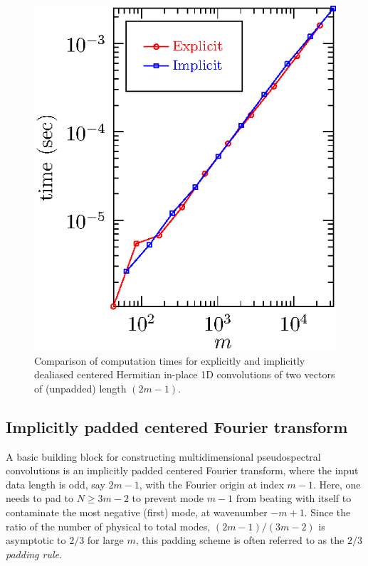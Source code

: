 \documentclass[final]{siamltex}
\begin{document}
\begin{figure}[htbp]
\begin{center}
\begin{minipage}{0.49\linewidth}
\begin{center}
\includegraphics{timing1r}
\caption{Comparison of computation times for explicitly and implicitly
dealiased centered Hermitian in-place 1D convolutions of two vectors of
(unpadded) length $(2m-1)$.}
\label{timing1r}
\end{center}
\end{minipage}
\end{center}
\end{figure}

\subsection{Implicitly padded centered Fourier transform}\label{fft0}
A basic building block for constructing multidimensional pseudospectral
convolutions is an implicitly padded centered Fourier transform, where the
input data length is odd, say $2m-1$, with the Fourier origin at index $m-1$. 
Here, one needs to pad to $N\ge 3m-2$ to prevent 
mode $m-1$ from beating with itself to contaminate the most negative
(first) mode, at wavenumber $-m+1$. Since the ratio of the number of physical to
total modes, $(2m-1)/(3m-2)$ is asymptotic to $2/3$ for large $m$, this
padding scheme is often referred to as the {\it $2/3$ padding rule}.
\end{document}
